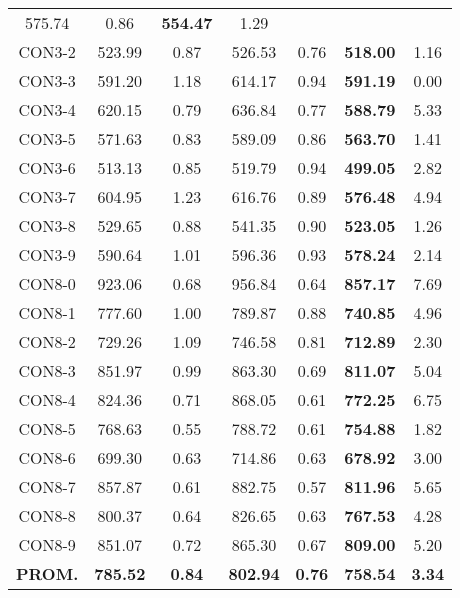 \begin{table}[ht]
\begin{tabular}{c c c c c c c}
575.74 & 0.86 & \bf{554.47} & 
1.29\\CON3-2 & 523.99 & 0.87 & 
526.53 & 0.76 & \bf{518.00} & 
1.16\\CON3-3 & 591.20 & 1.18 & 
614.17 & 0.94 & \bf{591.19} & 
0.00\\CON3-4 & 620.15 & 0.79 & 
636.84 & 0.77 & \bf{588.79} & 
5.33\\CON3-5 & 571.63 & 0.83 & 
589.09 & 0.86 & \bf{563.70} & 
1.41\\CON3-6 & 513.13 & 0.85 & 
519.79 & 0.94 & \bf{499.05} & 
2.82\\CON3-7 & 604.95 & 1.23 & 
616.76 & 0.89 & \bf{576.48} & 
4.94\\CON3-8 & 529.65 & 0.88 & 
541.35 & 0.90 & \bf{523.05} & 
1.26\\CON3-9 & 590.64 & 1.01 & 
596.36 & 0.93 & \bf{578.24} & 
2.14\\CON8-0 & 923.06 & 0.68 & 
956.84 & 0.64 & \bf{857.17} & 
7.69\\CON8-1 & 777.60 & 1.00 & 
789.87 & 0.88 & \bf{740.85} & 
4.96\\CON8-2 & 729.26 & 1.09 & 
746.58 & 0.81 & \bf{712.89} & 
2.30\\CON8-3 & 851.97 & 0.99 & 
863.30 & 0.69 & \bf{811.07} & 
5.04\\CON8-4 & 824.36 & 0.71 & 
868.05 & 0.61 & \bf{772.25} & 
6.75\\CON8-5 & 768.63 & 0.55 & 
788.72 & 0.61 & \bf{754.88} & 
1.82\\CON8-6 & 699.30 & 0.63 & 
714.86 & 0.63 & \bf{678.92} & 
3.00\\CON8-7 & 857.87 & 0.61 & 
882.75 & 0.57 & \bf{811.96} & 
5.65\\CON8-8 & 800.37 & 0.64 & 
826.65 & 0.63 & \bf{767.53} & 
4.28\\CON8-9 & 851.07 & 0.72 & 
865.30 & 0.67 & \bf{809.00} & 
5.20\\\bf{PROM.} & 
\bf{785.52} & \bf{0.84} & \bf{802.94} & \bf{0.76} & \bf{758.54} & \bf{3.34}\\[1ex]\hline
\end{tabular}
\label{table:nonlin}
\end{table} \clearpage
